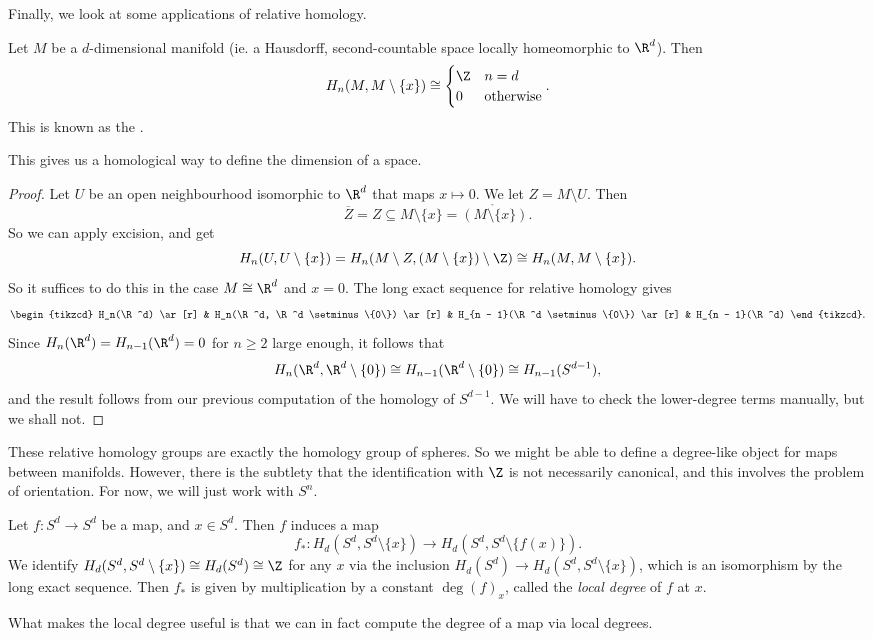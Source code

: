 \documentclass[a4paper]{article}
\begin{document}
Finally, we look at some applications of relative homology.

\begin{lemma}
  Let $M$ be a $d$-dimensional manifold (ie. a Hausdorff, second-countable space locally homeomorphic to $\R^d$). Then
  \[
    H_n(M, M \setminus \{x\}) \cong
    \begin{cases}
      \Z & n = d\\
      0 & \text{otherwise}
    \end{cases}.
  \]
  This is known as the .
\end{lemma}
This gives us a homological way to define the dimension of a space.

\begin{proof}
  Let $U$ be an open neighbourhood isomorphic to $\R^d$ that maps $x \mapsto 0$. We let $Z = M\setminus U$. Then
  \[
    \overline{Z} = Z \subseteq M \setminus \{x\} = \mathring{(M \setminus \{x\})}.
  \]
  So we can apply excision, and get
  \[
    H_n(U, U \setminus \{x\}) = H_n(M\setminus Z, (M\setminus \{x\})\setminus \Z) \cong H_n(M, M\setminus \{x\}).
  \]
  So it suffices to do this in the case $M \cong \R^d$ and $x = 0$. The long exact sequence for relative homology gives
  \[
    \begin{tikzcd}
      H_n(\R^d) \ar[r] & H_n(\R^d, \R^d \setminus \{0\}) \ar[r] & H_{n - 1}(\R^d \setminus \{0\}) \ar[r] & H_{n - 1}(\R^d)
    \end{tikzcd}.
  \]
  Since $H_n(\R^d) = H_{n - 1}(\R^d) = 0$ for $n \geq 2$ large enough, it follows that
  \[
    H_n(\R^d, \R^d \setminus \{0\}) \cong H_{n - 1}(\R^d \setminus \{0\}) \cong H_{n - 1}(S^{d - 1}),
  \]
  and the result follows from our previous computation of the homology of $S^{d - 1}$. We will have to check the lower-degree terms manually, but we shall not.
\end{proof}

These relative homology groups are exactly the homology group of spheres. So we might be able to define a degree-like object for maps between manifolds. However, there is the subtlety that the identification with $\Z$ is not necessarily canonical, and this involves the problem of orientation. For now, we will just work with $S^n$.

\begin{defi}
  Let $f: S^d \to S^d$ be a map, and $x \in S^d$. Then $f$ induces a map
  \[
    f_*: H_d(S^d, S^d \setminus \{x\}) \to H_d(S^d, S^d \setminus \{f(x)\}).
  \]
  We identify $H_d(S^d, S^d \setminus \{x\}) \cong H_d(S^d) \cong \Z$ for any $x$ via the inclusion $H_d(S^d) \to H_d(S^d, S^d \setminus \{x\})$, which is an isomorphism by the long exact sequence. Then $f_*$ is given by multiplication by a constant $\deg(f)_x$, called the \emph{local degree} of $f$ at $x$.
\end{defi}
What makes the local degree useful is that we can in fact compute the degree of a map via local degrees. %
\end{document}
